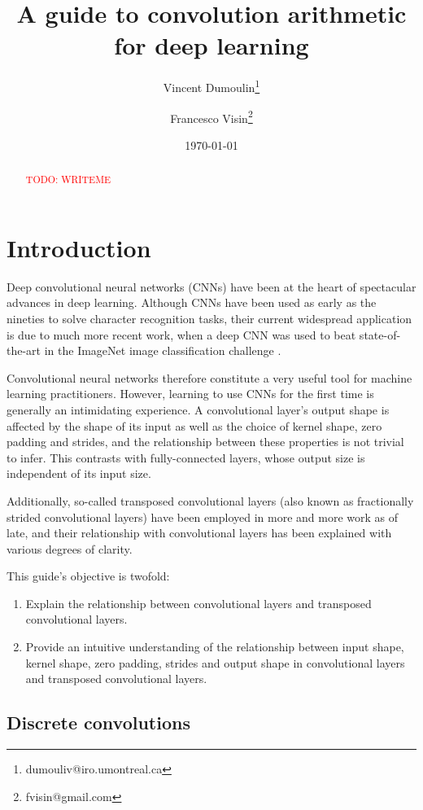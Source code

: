 \documentclass{article}
\title{A guide to convolution arithmetic for deep learning}
\author[1]{Vincent Dumoulin\thanks{dumouliv@iro.umontreal.ca}}
\author[1]{Francesco Visin\thanks{fvisin@gmail.com}}
\affil[1]{MILA, Universit\'{e} de Montr\'{e}al}
\date{\today}
\newcommand{\todo}[1]{\textcolor{red}{TODO: #1}}
\begin{document}
\maketitle

\begin{abstract}
\todo{WRITEME}
\end{abstract}

\section{Introduction}

Deep convolutional neural networks (CNNs) have been at the heart of spectacular
advances in deep learning. Although CNNs have been used as early as the nineties
\citep{lecun1998gradient} to solve character recognition tasks, their current
widespread application is due to much more recent work, when a deep CNN was used
to beat state-of-the-art in the ImageNet image classification challenge
\citep{krizhevsky2012imagenet}.

Convolutional neural networks therefore constitute a very useful tool for
machine learning practitioners. However, learning to use CNNs for the first time
is generally an intimidating experience. A convolutional layer's output shape is
affected by the shape of its input as well as the choice of kernel shape, zero
padding and strides, and the relationship between these properties is not
trivial to infer. This contrasts with fully-connected layers, whose output size
is independent of its input size.

Additionally, so-called transposed convolutional layers (also known as
fractionally strided convolutional layers) have been employed in more and more
work as of late, and their relationship with convolutional layers has been
explained with various degrees of clarity.

This guide's objective is twofold:

\begin{enumerate}
    \item Explain the relationship between convolutional layers and transposed
        convolutional layers.
    \item Provide an intuitive understanding of the relationship between input
        shape, kernel shape, zero padding, strides and output shape in
        convolutional layers and transposed convolutional layers.
\end{enumerate}

\subsection{Discrete convolutions}
\end{document}
